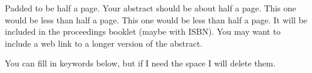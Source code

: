 \documentclass[titlepage=false]{article} %
\def\keywords#1{\begin{center}{\bf Keywords}\\{#1}\end{center}} %
\begin{document}
Padded to be half a page.  Your abstract should be about half a page.  This one would be less than half a page.  This one would be less than half a page. It will be  included in the proceedings
booklet (maybe with ISBN).  You may want to include a web link to a longer version of the abstract.

You can fill in keywords below, but if I need the space I will delete them.



\endgroup


\end{document}
